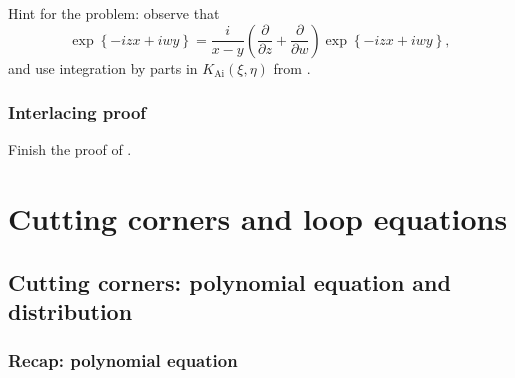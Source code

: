 \documentclass[letterpaper,11pt,oneside,reqno]{book}
\numberwithin{equation}{chapter}  %
\theoremstyle{definition}
\begin{document}
Hint for the problem: observe that
\begin{equation*}
	\exp\left\{ -i z x+iwy \right\}=\frac{i}{x-y}\left( \frac{\partial}{\partial z}+
	\frac{\partial}{\partial w}\right)\exp\left\{ -i z x+iwy \right\},
\end{equation*}
and use integration by parts in $K_{\mathrm{Ai}}(\xi,\eta)$
from .

\subsection{Interlacing proof}
\label{lecture7:prob:interlacing}

Finish the proof of .















\chapter{Cutting corners and loop equations}
\label{chap:lecture8}





\section{Cutting corners: polynomial equation and distribution}

\subsection{Recap: polynomial equation}
\end{document}
